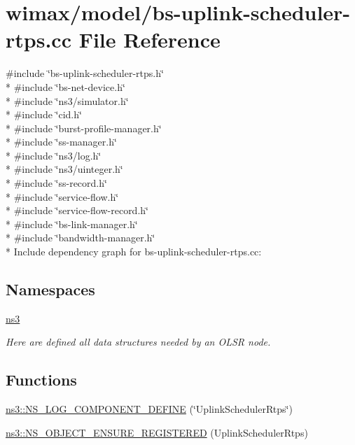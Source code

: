 \hypertarget{bs-uplink-scheduler-rtps_8cc}{}\section{wimax/model/bs-\/uplink-\/scheduler-\/rtps.cc File Reference}
\label{bs-uplink-scheduler-rtps_8cc}
{\ttfamily \#include \char`\"{}bs-\/uplink-\/scheduler-\/rtps.\+h\char`\"{}}\\*
{\ttfamily \#include \char`\"{}bs-\/net-\/device.\+h\char`\"{}}\\*
{\ttfamily \#include \char`\"{}ns3/simulator.\+h\char`\"{}}\\*
{\ttfamily \#include \char`\"{}cid.\+h\char`\"{}}\\*
{\ttfamily \#include \char`\"{}burst-\/profile-\/manager.\+h\char`\"{}}\\*
{\ttfamily \#include \char`\"{}ss-\/manager.\+h\char`\"{}}\\*
{\ttfamily \#include \char`\"{}ns3/log.\+h\char`\"{}}\\*
{\ttfamily \#include \char`\"{}ns3/uinteger.\+h\char`\"{}}\\*
{\ttfamily \#include \char`\"{}ss-\/record.\+h\char`\"{}}\\*
{\ttfamily \#include \char`\"{}service-\/flow.\+h\char`\"{}}\\*
{\ttfamily \#include \char`\"{}service-\/flow-\/record.\+h\char`\"{}}\\*
{\ttfamily \#include \char`\"{}bs-\/link-\/manager.\+h\char`\"{}}\\*
{\ttfamily \#include \char`\"{}bandwidth-\/manager.\+h\char`\"{}}\\*
Include dependency graph for bs-\/uplink-\/scheduler-\/rtps.cc\+:
\subsection*{Namespaces}
\begin{DoxyCompactItemize}
\item 
 \hyperlink{namespacens3}{ns3}
\begin{DoxyCompactList}\small\item\em Here are defined all data structures needed by an O\+L\+SR node. \end{DoxyCompactList}\end{DoxyCompactItemize}
\subsection*{Functions}
\begin{DoxyCompactItemize}
\item 
\hyperlink{namespacens3_a54f3576a4ff2b5638a59f75e2fceede2}{ns3\+::\+N\+S\+\_\+\+L\+O\+G\+\_\+\+C\+O\+M\+P\+O\+N\+E\+N\+T\+\_\+\+D\+E\+F\+I\+NE} (\char`\"{}Uplink\+Scheduler\+Rtps\char`\"{})
\item 
\hyperlink{namespacens3_a52660de72e9c07e038725fb970e28b0c}{ns3\+::\+N\+S\+\_\+\+O\+B\+J\+E\+C\+T\+\_\+\+E\+N\+S\+U\+R\+E\+\_\+\+R\+E\+G\+I\+S\+T\+E\+R\+ED} (Uplink\+Scheduler\+Rtps)
\end{DoxyCompactItemize}
